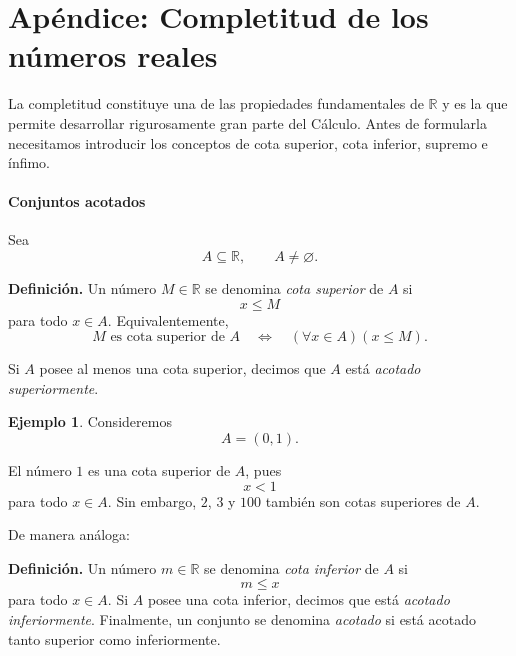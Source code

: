 \documentclass[12pt]{article}
\theoremstyle{plain}
\theoremstyle{definition}
\newtheorem{Ejem}[Teo]{Ejemplo}
\theoremstyle{remark}
\begin{document}
{%
\part{Ap\'endice: Completitud de los números reales}
\setcounter{section}{1}


La completitud constituye una de las propiedades fundamentales de $\mathbb{R}$ y es la que permite desarrollar rigurosamente gran parte del Cálculo. Antes de formularla necesitamos introducir los conceptos de cota superior, cota inferior, supremo e ínfimo.

\subsection*{Conjuntos acotados}

Sea
\[
A\subseteq\mathbb{R},
\qquad A\neq\varnothing.
\]

\textbf{Definición.}
Un número $M\in\mathbb{R}$ se denomina \emph{cota superior} de $A$ si
\[
x\leq M
\]
para todo $x\in A$. Equivalentemente,
\[
M\text{ es cota superior de }A
\quad\Longleftrightarrow\quad
(\forall x\in A)(x\leq M).
\]

Si $A$ posee al menos una cota superior, decimos que $A$ está
\emph{acotado superiormente}.

\begin{Ejem}
Consideremos
\[
A=(0,1).
\]

El número $1$ es una cota superior de $A$, pues
\[
x<1
\]
para todo $x\in A$. Sin embargo, $2$, $3$ y $100$ también son cotas superiores de $A$.
\end{Ejem}

De manera análoga:

\textbf{Definición.}
Un número $m\in\mathbb{R}$ se denomina \emph{cota inferior} de $A$ si
\[
m\leq x
\]
para todo $x\in A$. Si $A$ posee una cota inferior, decimos que está
\emph{acotado inferiormente}. Finalmente, un conjunto se denomina \emph{acotado} si está acotado tanto
superior como inferiormente.

}
\end{document}

